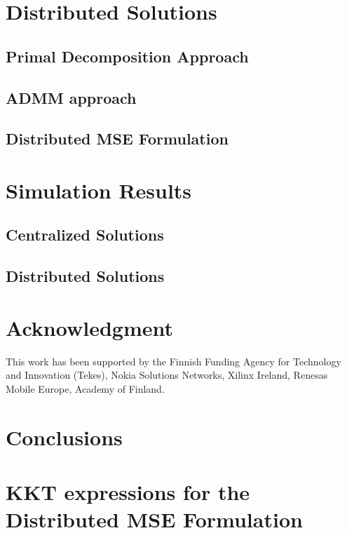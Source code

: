 \documentclass[10pt,letterpaper,journal,onecolumn]{./../Styles/IEEEtran}
\begin{document}
\section{Distributed Solutions} \label{sec-4}



\subsection{Primal Decomposition Approach} \label{sec-4.1}


%

\subsection{\ac{ADMM} approach} \label{sec-4.2}


%

\subsection{Distributed MSE Formulation} \label{sec-4.3}



\section{Simulation Results} \label{sec-5}
\subsection{Centralized Solutions}


\subsection{Distributed Solutions}


\section*{Acknowledgment}
This work has been supported by the Finnish Funding Agency for Technology and Innovation (Tekes), Nokia Solutions Networks, Xilinx Ireland, Renesas Mobile Europe, Academy of Finland.

\section{Conclusions}

\appendices

\section{\ac{KKT} expressions for the Distributed MSE Formulation} \label{a-1}




\end{document}
